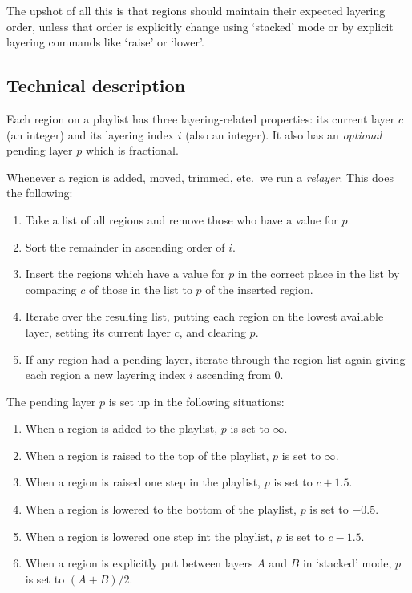 \documentclass{article}
\begin{document}
The upshot of all this is that regions should maintain their expected layering
order, unless that order is explicitly change using `stacked' mode or by
explicit layering commands like `raise' or `lower'.



\subsection{Technical description}

Each region on a playlist has three layering-related properties: its current
layer $c$ (an integer) and its layering index $i$ (also an integer).  It also
has an \emph{optional} pending layer $p$ which is fractional.

Whenever a region is added, moved, trimmed, etc.\ we run a \emph{relayer}.  This
does the following:

\begin{enumerate}
\item Take a list of all regions and remove those who have a value for $p$.
\item Sort the remainder in ascending order of $i$.
\item Insert the regions which have a value for $p$ in the correct place in the
  list by comparing $c$ of those in the list to $p$ of the inserted region.
\item Iterate over the resulting list, putting each region on the lowest available
  layer, setting its current layer $c$, and clearing $p$.
\item If any region had a pending layer, iterate through the region list again
  giving each region a new layering index $i$ ascending from 0.
\end{enumerate}

The pending layer $p$ is set up in the following situations:
\begin{enumerate}
\item When a region is added to the playlist, $p$ is set to $\infty$.
\item When a region is raised to the top of the playlist, $p$ is set to $\infty$.
\item When a region is raised one step in the playlist, $p$ is set to $c + 1.5$.
\item When a region is lowered to the bottom of the playlist, $p$ is set to $-0.5$.
\item When a region is lowered one step int the playlist, $p$ is set to $c - 1.5$.
\item When a region is explicitly put between layers $A$ and $B$ in `stacked'
  mode, $p$ is set to $(A + B) / 2$.
\end{enumerate}
\end{document}
